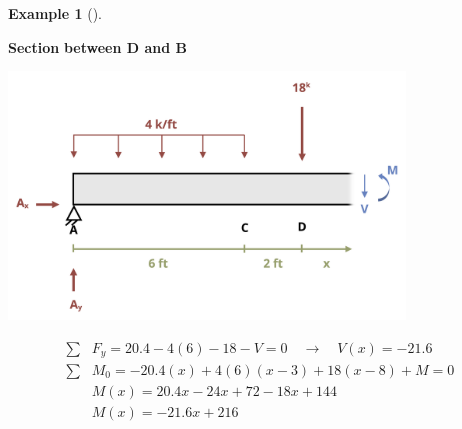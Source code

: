 \documentclass[
  letterpaper,
  DIV=11,
  numbers=noendperiod]{scrreprt}
\theoremstyle{definition}
\newtheorem{example}{Example}[chapter]
\theoremstyle{remark}
\begin{document}
\begin{tcolorbox}
\begin{example}[]
\begin{tcolorbox}
\textbf{Section} \textbf{between D and B}

\begin{center}
\includegraphics[width=4.14583in,height=\textheight]{images/CH7 PNGs/example 7.2 part 8.png}
\end{center}

\[
\begin{aligned}
\sum &F_y = 20.4-4(6)-18-V=0 \quad\rightarrow\quad V(x) =-21.6 \\
\sum &M_0 =-20.4(x)+4(6)(x-3)+18(x-8)+M=0 \\
& M(x) =20.4 x-24 x+72-18 x+144 \\
&M(x) =-21.6 x+216
\end{aligned}
\]


\end{tcolorbox}
\end{example}
\end{tcolorbox}
\end{document}
